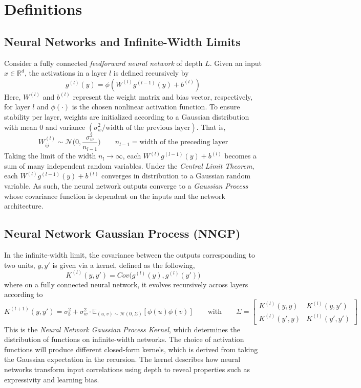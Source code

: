 \documentclass{article}
\newcommand{\R}{\mathbb{R}}
\newcommand{\NL}{\newline 
\newline}
\newcommand{\EX}{\mathbb{E}}
\begin{document}
\section{Definitions}
\subsection{Neural Networks and Infinite-Width Limits}
Consider a fully connected \textit{feedforward neural network} of depth $L$. Given an input $x\in \R^d$, the activations in a layer $l$ is defined recursively by 
$$g^{(l)}(y)=\phi(W^{(l)}g^{(l-1)}(y)+b^{(l)})$$
Here, $W^{(l)}$ and $b^{(l)}$ represent the weight matrix and bias vector, respectively, for layer $l$ and $\phi(\cdot)$ is the chosen nonlinear activation function. To ensure stability per layer, weights are initialized according to a Gaussian distribution with mean 0 and variance $(\sigma^2_w/\text{width of the previous layer})$. That is,
$$W^{(l)}_{ij}\sim \mathcal{N}\Bigg(0,\frac{\sigma_w^2}{n_{l-1}}\Bigg)\qquad n_{l-1}=\text{width of the preceding layer}$$
Taking the limit of the width $n_l\to \infty$, each $W^{(l)}g^{(l-1)}(y)+b^{(l)}$ becomes a sum of many independent random variables. Under the \textit{Central Limit Theorem}, each $W^{(l)}g^{(l-1)}(y)+b^{(l)}$ converges in distribution to a Gaussian random variable. As such, the neural network outputs converge to a \textit{Gaussian Process} whose covariance function is dependent on the inputs and the network architecture.
\subsection{Neural Network Gaussian Process (NNGP)}
In the infinite-width limit, the covariance between the outputs corresponding to two units, $y,y'$ is given via a kernel, defined as the following,
$$K^{(l)}(y,y')=Cov\Big(g^{(l)}(y),g^{(l)}(y')\Big)$$
where on a fully connected neural network, it evolves recursively across layers according to
$$K^{(l+1)}(y,y')=\sigma^2_b+\sigma^2_w\cdot\EX_{(u,v)\sim \mathcal{N}(0,\Sigma)}[\phi(u)\phi(v)]\qquad \text{with}\qquad \Sigma=\begin{bmatrix}
    K^{(l)}(y,y) & K^{(l)}(y,y')\\
    K^{(l)}(y',y) & K^{(l)}(y',y')
\end{bmatrix}$$
This is the \textit{Neural Network Gaussian Process Kernel}, which determines the distribution of functions on infinite-width networks. The choice of activation functions will produce different closed-form kernels, which is derived from taking the Gaussian expectation in the recursion.
\NL
The kernel describes how neural networks transform input correlations using depth to reveal properties such as expressivity and learning bias.
\end{document}
